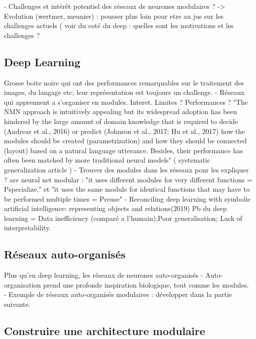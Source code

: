 - Challenges et intérêt potentiel des réseaux de neurones modulaires ? -> Evolution (wertmer, meunier) : pousser plus loin pour etre au jus sur les challenges actuels ( voir du coté du deep : quelles sont les motivations et les challenges ? 


\subsection{Deep Learning}
Grosse boite noire qui ont des performances remarquables sur le traitement des images, du langage etc; leur représentation est toujours un challenge.
- Réseaux qui apprennent a s'organiser en modules. Interet. Limites ? Performances ? \cite{Andreas2016NeuralMN,Kirsch2018ModularNL}
"The NMN approach is intuitively appealing but its
widespread adoption has been hindered by the large amount of domain knowledge that is required
to decide (Andreas et al., 2016) or predict (Johnson et al., 2017; Hu et al., 2017) how the modules
should be created (parametrization) and how they should be connected (layout) based on a natural
language utterance. Besides, their performance has often been matched by more traditional neural
models" ( systematic generalization article ) 
- Trouver des modules dans les réseaux pour les expliquer ? \cite{Watanabe2018ModularRO,Csordas2021AreNN}
are neural net modular : "it uses different modules for very different functions = Pspecialize," et "it uses the same module for identical functions that
may have to be performed multiple times = Preuse"
- Reconciling deep learning with symbolic artificial intelligence: representing objects and relations(2019)
Pb du deep learning = Data inefficiency (comparé a l'humain);Poor generalisation; Lack of interpretability.

\subsection{Réseaux auto-organisés}

Plus qu'en deep learning, les réseaux de neurones auto-organisés
- Auto-organisation prend une profonde inspiration biologique, tout comme les modules.
- Exemple de réseaux auto-organisés modulaires : développer dans la partie suivante.

\cite{johnsson_associative_2009}
\cite{LampinenClusteringPO}
\cite{parisiLL}

\subsection{Construire une architecture modulaire}


